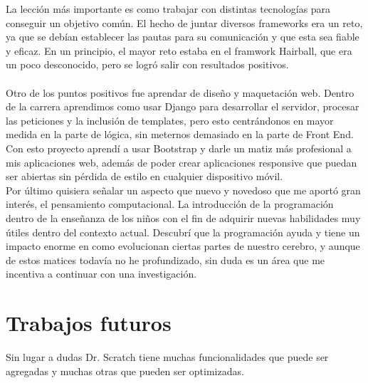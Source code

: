 \documentclass[a4paper, 12pt]{book}
\begin{document}
La lección más importante es como trabajar con distintas tecnologías para
conseguir un objetivo común. El hecho de juntar diversos frameworks era
un reto, ya que se debían establecer las pautas para su comunicación y 
que esta sea fiable y eficaz. En un principio, el mayor reto estaba en el
framwork Hairball, que era un poco desconocido, pero se logró salir con
resultados positivos. \\ \\

Otro de los puntos positivos fue aprendar de diseño y maquetación web. Dentro
de la carrera aprendimos como usar Django para desarrollar el servidor, 
procesar las peticiones y la inclusión de templates, pero esto centrándonos
en mayor medida en la parte de lógica, sin meternos demasiado en la parte
de Front End. Con esto proyecto aprendí a usar Bootstrap y darle un matiz
más profesional a mis aplicaciones web, además de poder crear aplicaciones
responsive que puedan ser abiertas sin pérdida de estilo en cualquier
dispositivo móvil. \\

Por último quisiera señalar un aspecto que nuevo y novedoso que me aportó
gran interés, el pensamiento computacional. La introducción de la 
programación dentro de la enseñanza de los niños con el fin de adquirir
nuevas habilidades muy útiles dentro del contexto actual. Descubrí que 
la programación ayuda y tiene un impacto enorme en como evolucionan 
ciertas partes de nuestro cerebro, y aunque de estos matices todavía
no he profundizado, sin duda es un área que me incentiva a continuar con
una investigación. \\


\section{Trabajos futuros}
\label{sec:trabajos_futuros}


Sin lugar a dudas Dr. Scratch tiene muchas funcionalidades que puede ser agregadas
y muchas otras que pueden ser optimizadas.
\end{document}
